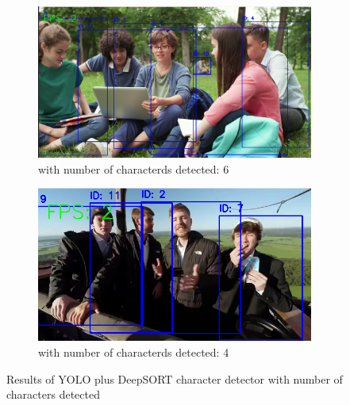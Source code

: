 \documentclass[twoside,english]{article}
\begin{document}
\begin{figure}[!h]
    \begin{subfigure}{.5\textwidth}
          \centering
          \includegraphics[width=0.9\linewidth]{imgs/out1.png}
          \caption{with number of characterds detected: 6}
          \label{out1a}
    \end{subfigure}%
    \begin{subfigure}{.5\textwidth}
          \centering
          \includegraphics[width=0.9\linewidth]{imgs/out2.png}
          \caption{with number of characterds detected: 4}
          \label{out1b}
    \end{subfigure}
    
    \caption{Results of YOLO plus DeepSORT character detector with number of characters detected}
    \label{out1}
\end{figure}
\end{document}
